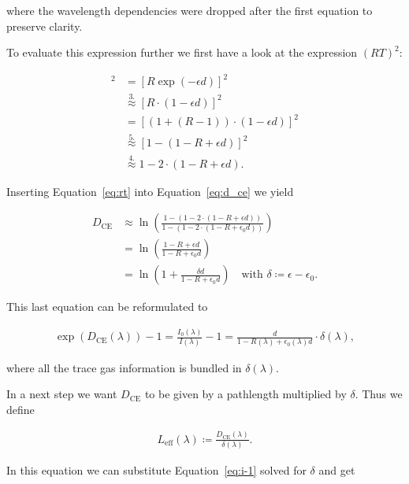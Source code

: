 where the wavelength dependencies were dropped after the first
equation to preserve clarity. 

To evaluate this expression further we
first have a look at the expression $(RT)^2$:

\begin{align}
  [RT]^2 & = [R \exp(-\epsilon d)]^2 \nonumber\\
         & \stackrel{3.}{\approx} [R \cdot(1 - \epsilon d)]^2 \nonumber\\
         & = [(1 + (R - 1))\cdot (1 - \epsilon d)]^2 \nonumber\\
         & \stackrel{5.}{\approx} [1 - (1 - R + \epsilon d)]^2 \nonumber\\
         & \stackrel{4.}{\approx} 1 - 2 \cdot (1 - R + \epsilon d)\label{eq:rt}.
\end{align}

Inserting Equation~\eqref{eq:rt} into Equation~\eqref{eq:d_ce} we
yield

\begin{align}
  D_{\text{CE}} & \approx \ln \left ( \frac{1 - (1 - 2\cdot ( 1- R +
  \epsilon d))}{1 - (1 - 2 \cdot (1 - R + \epsilon_0 d))}\right)\\
  & = \ln \left ( \frac{1 - R + \epsilon d}{1 - R + \epsilon_0
    d}\right) \\
  & = \ln \left ( 1 + \frac{ \delta d}{1 - R + \epsilon_0 d}\right) \quad
    \text{with } \delta \coloneqq \epsilon - \epsilon_0.
\end{align}

This last equation can be reformulated to

\begin{align}
  \exp(D_{\text{CE}}(\lambda)) - 1 = \frac{I_0(\lambda)}{I(\lambda)} -
  1 = \frac{d}{1 - R(\lambda) + \epsilon_0(\lambda) d} \cdot
  \delta(\lambda)\label{eq:i-1}, 
\end{align}

where all the trace gas information is bundled in $\delta(\lambda)$.

In a next step we want $D_{\text{CE}}$ to be given by a
pathlength multiplied by $\delta$. Thus we define

\begin{align}
  L_{\text{eff}}(\lambda) \coloneqq \frac{D_{\text{CE}}(\lambda)}{\delta(\lambda)}.
\end{align}

In this equation we can substitute Equation~\ref{eq:i-1} solved for
$\delta$ and get


